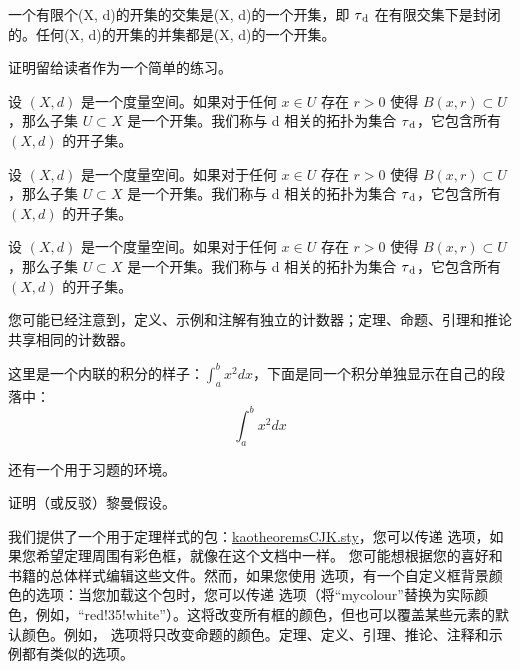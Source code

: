 \begin{Corollary}
	一个有限个(X, d)的开集的交集是(X, d)的一个开集，即 $\tau\textsubscript{d}$ 在有限交集下是封闭的。任何(X, d)的开集的并集都是(X, d)的一个开集。
\end{Corollary}

\begin{Proof*}
	证明留给读者作为一个简单的练习。
\end{Proof*}

\begin{Definition}
	设 $(X, d)$ 是一个度量空间。如果对于任何 $x \in U$ 存在 $r > 0$ 使得 $B(x, r) \subset U$，那么子集 $U \subset X$ 是一个开集。我们称与 d 相关的拓扑为集合 $\tau\textsubscript{d}$，它包含所有 $(X, d)$ 的开子集。
\end{Definition}


\begin{Example}
	设 $(X, d)$ 是一个度量空间。如果对于任何 $x \in U$ 存在 $r > 0$ 使得 $B(x, r) \subset U$，那么子集 $U \subset X$ 是一个开集。我们称与 d 相关的拓扑为集合 $\tau\textsubscript{d}$，它包含所有 $(X, d)$ 的开子集。
\end{Example}

\begin{remark}
	设 $(X, d)$ 是一个度量空间。如果对于任何 $x \in U$ 存在 $r > 0$ 使得 $B(x, r) \subset U$，那么子集 $U \subset X$ 是一个开集。我们称与 d 相关的拓扑为集合 $\tau\textsubscript{d}$，它包含所有 $(X, d)$ 的开子集。
\end{remark}

您可能已经注意到，定义、示例和注解有独立的计数器；定理、命题、引理和推论共享相同的计数器。

\begin{remark}
	这里是一个内联的积分的样子：$\int_{a}^{b} x^2 dx$，下面是同一个积分单独显示在自己的段落中：
	\[\int_{a}^{b} x^2 dx\]
\end{remark}

还有一个用于习题的环境。

\begin{exercise}
	证明（或反驳）黎曼假设。
\end{exercise}

我们提供了一个用于定理样式的包：\href{kaotheoremsCJK.sty}{kaotheoremsCJK.sty}，您可以传递  选项，如果您希望定理周围有彩色框，就像在这个文档中一样。 您可能想根据您的喜好和书籍的总体样式编辑这些文件。然而，如果您使用  选项，有一个自定义框背景颜色的选项：当您加载这个包时，您可以传递  选项（将“mycolour”替换为实际颜色，例如，“red!35!white”）。这将改变所有框的颜色，但也可以覆盖某些元素的默认颜色。例如， 选项将只改变命题的颜色。定理、定义、引理、推论、注释和示例都有类似的选项。

